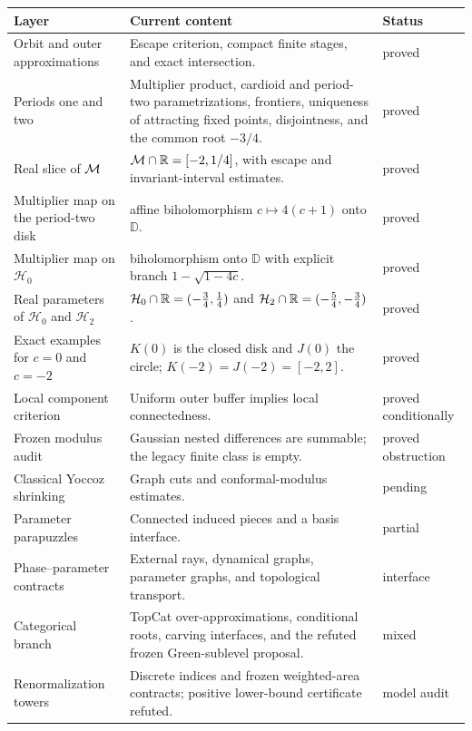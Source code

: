 \begin{center}\small
\begin{tabularx}{0.98\textwidth}{@{}P{0.25\textwidth}@{\hspace{8pt}}Y@{\hspace{8pt}}P{0.13\textwidth}@{}}
\textbf{Layer} & \textbf{Current content} & \textbf{Status}\\
\hline
Orbit and outer approximations &
Escape criterion, compact finite stages, and exact intersection. &
proved\\
Periods one and two &
Multiplier product, cardioid and period-two parametrizations, frontiers,
uniqueness of attracting fixed points, disjointness, and the common root $-3/4$. &
proved\\
Real slice of $\mathcal M$ &
$\mathcal M\cap\mathbb R=[-2,1/4]$, with escape and invariant-interval estimates. &
proved\\
Multiplier map on the period-two disk &
affine biholomorphism $c\mapsto4(c+1)$ onto $\mathbb D$. &
proved\\
Multiplier map on $\mathcal H_0$ &
biholomorphism onto $\mathbb D$ with explicit branch $1-\sqrt{1-4c}$. &
proved\\
Real parameters of $\mathcal H_0$ and $\mathcal H_2$ &
$\mathcal H_0\cap\mathbb R=(-\tfrac34,\tfrac14)$ and $\mathcal H_2\cap\mathbb R=(-\tfrac54,-\tfrac34)$. &
proved\\
Exact examples for $c=0$ and $c=-2$ &
$K(0)$ is the closed disk and $J(0)$ the circle; $K(-2)=J(-2)=[-2,2]$. &
proved\\
Local component criterion &
Uniform outer buffer implies local connectedness. &
proved conditionally\\
Frozen modulus audit &
Gaussian nested differences are summable; the legacy finite class is empty. &
proved obstruction\\
Classical Yoccoz shrinking &
Graph cuts and conformal-modulus estimates. &
pending\\
Parameter parapuzzles &
Connected induced pieces and a basis interface. &
partial\\
Phase--parameter contracts &
External rays, dynamical graphs, parameter graphs, and topological transport. &
interface\\
Categorical branch &
TopCat over-approximations, conditional roots, carving interfaces, and the
refuted frozen Green-sublevel proposal. &
mixed\\
Renormalization towers &
Discrete indices and frozen weighted-area contracts; positive lower-bound
certificate refuted. &
model audit\\

\end{tabularx}
\end{center}
